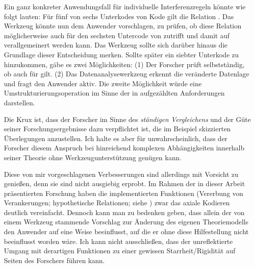 Ein ganz konkreter Anwendungsfall für individuelle Interferenzregeln könnte wie folgt lauten: Für fünf von sechs Unterkodes von Kode  gilt die Relation . Das Werkzeug könnte nun dem Anwender vorschlagen, zu prüfen, ob diese Relation möglicherweise auch für den sechsten Untercode von  zutrifft und damit auf  verallgemeinert werden kann. Das Werkzeug sollte sich darüber hinaus die Grundlage dieser Entscheidung merken. Sollte später ein siebter Unterkode zu  hinzukommen, gäbe es zwei Möglichkeiten: (1) Der Forscher prüft selbstständig, ob  auch für  gilt. (2) Das Datenanalysewerkzeug erkennt die veränderte Datenlage und fragt den Anwender aktiv. Die zweite Möglichkeit würde eine Umstrukturierungsoperation im Sinne der in  aufgezählten Anforderungen darstellen.

Die Krux ist, dass der Forscher im Sinne des \textit{ständigen Vergleichens} und der Güte seiner Forschungsergebnisse  dazu verpflichtet ist, die im Beispiel skizzierten Überlegungen anzustellen. Ich halte es aber für unwahrscheinlich, dass der Forscher diesem Anspruch bei hinreichend komplexen Abhängigkeiten innerhalb seiner Theorie ohne Werkzeugunterstützung genügen kann.

Diese von mir vorgeschlagenen Verbesserungen sind allerdings mit Vorsicht zu genießen, denn sie sind nicht ausgiebig erprobt. Im Rahmen der in dieser Arbeit präsentierten Forschung haben die implementierten Funktionen (Vererbung von Verankerungen; hypothetische Relationen; siehe ) zwar das axiale Kodieren deutlich vereinfacht. Dennoch kann man zu bedenken geben, dass allein der von einem Werkzeug stammende Vorschlag zur Änderung des eigenen Theoriemodells den Anwender auf eine Weise beeinflusst, auf die er ohne diese Hilfestellung nicht beeinflusst worden wäre. Ich kann nicht ausschließen, dass der unreflektierte Umgang mit derartigen Funktionen zu einer gewissen Starrheit/Rigidität auf Seiten des Forschers führen kann.


